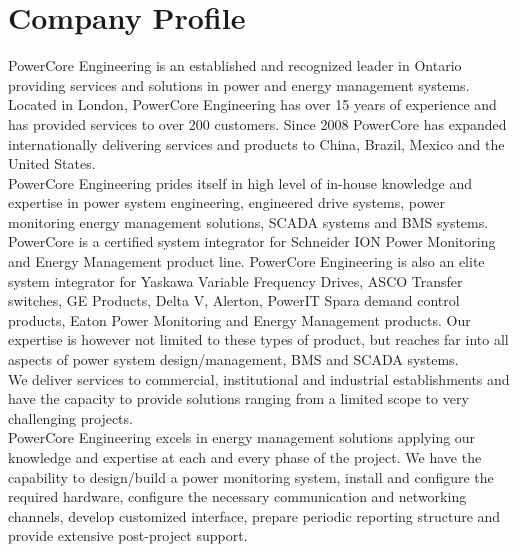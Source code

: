 

\section{Company Profile}
\label{intro}

PowerCore Engineering is an established and recognized leader in Ontario providing services and solutions in power and energy management systems. Located in London, PowerCore Engineering has over 15 years of experience and has provided services to over 200 customers. Since 2008 PowerCore has expanded internationally delivering services and products to China, Brazil, Mexico and the United States.\\

PowerCore Engineering prides itself in high level of in-house knowledge and expertise in power system engineering, engineered drive systems, power monitoring  energy management solutions, SCADA systems and BMS systems. \\

PowerCore is a certified system integrator for Schneider ION Power Monitoring and Energy Management product line. PowerCore Engineering is also an elite system integrator for Yaskawa Variable Frequency Drives, ASCO Transfer switches, GE Products, Delta V, Alerton, PowerIT Spara demand control products, Eaton Power Monitoring and Energy Management products. Our expertise is however not limited to these types of product, but reaches far into all aspects of power system design/management, BMS and SCADA systems.\\

We deliver services to commercial, institutional and industrial establishments and have the capacity to provide solutions ranging from a limited scope to very challenging projects.\\

PowerCore Engineering excels in energy management solutions applying our knowledge and expertise at each and every phase of the project.  We have the capability to design/build a power monitoring system, install and configure the required hardware, configure the necessary communication and networking channels, develop customized interface, prepare periodic reporting structure and provide extensive post-project support. \\

